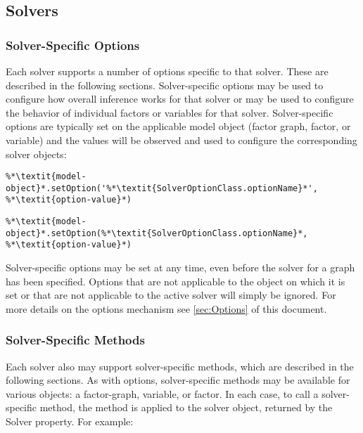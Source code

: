 \subsection{Solvers}
\label{sec:SolversAPI}


\subsubsection{Solver-Specific Options}

Each solver supports a number of options specific to that solver. These are described in the following sections. Solver-specific options may be used to configure how overall inference works for that solver or may be used to configure the behavior of individual factors or variables for that solver. Solver-specific options are typically set on the applicable model object (factor graph, factor, or variable) and the values will be observed and used to configure the corresponding solver objects:

\ifmatlab
\begin{lstlisting}
%*\textit{model-object}*.setOption('%*\textit{SolverOptionClass.optionName}*', %*\textit{option-value}*)
\end{lstlisting}
\fi
\ifjava
\begin{lstlisting}
%*\textit{model-object}*.setOption(%*\textit{SolverOptionClass.optionName}*, %*\textit{option-value}*)
\end{lstlisting}
\fi

Solver-specific options may be set at any time, even before the solver for a graph has been specified.  Options that are not applicable to the object on which it is set or that are not applicable to the active solver will simply be ignored.  For more details on the options mechanism see \autoref{sec:Options} of this document.

\subsubsection{Solver-Specific Methods}

Each solver also may support solver-specific methods, which are described in the following sections. As with options, solver-specific methods may be available for various objects: a factor-graph, variable, or factor. In each case, to call a solver-specific method, the method is applied to the solver object, returned by the Solver property.  For example:

